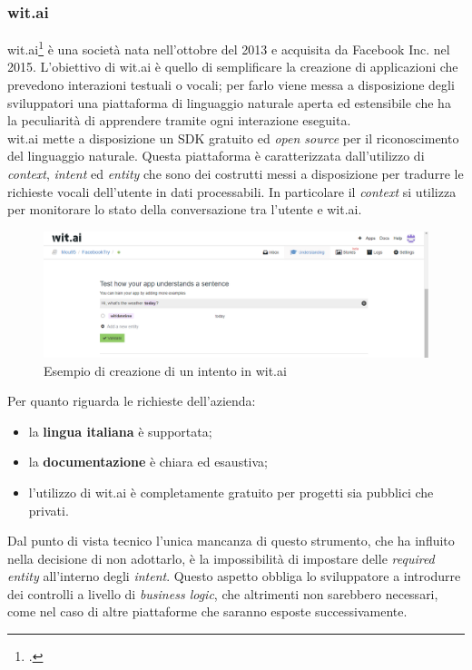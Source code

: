 \subsubsection{wit.ai}
wit.ai\footcite{witai} è una società nata nell'ottobre del 2013 e acquisita da Facebook Inc. nel 2015.
L'obiettivo di wit.ai è quello di semplificare la creazione di applicazioni che prevedono interazioni testuali o vocali; per farlo viene messa a disposizione degli sviluppatori una piattaforma di linguaggio naturale aperta ed estensibile che ha la peculiarità di apprendere tramite ogni interazione eseguita.\\
wit.ai mette a disposizione un SDK gratuito ed \emph{open source} per il riconoscimento del linguaggio
naturale. Questa piattaforma è caratterizzata dall'utilizzo di \emph{context}, \emph{intent} ed \emph{entity} che sono
dei costrutti messi a disposizione per tradurre le richieste vocali dell'utente in dati processabili. In particolare il \emph{context} si utilizza per monitorare lo stato della conversazione tra l'utente e wit.ai.

\begin{figure}[h]
	\centering
	\includegraphics[scale=0.4]{../Immagini/witai_example.png}
	\caption{Esempio di creazione di un intento in wit.ai}
\end{figure}

Per quanto riguarda le richieste dell'azienda:
\begin{itemize}
	\item la \textbf{lingua italiana} è supportata;
	\item la \textbf{documentazione} è chiara ed esaustiva;
	\item l'utilizzo di wit.ai è completamente gratuito per progetti sia pubblici che privati.
\end{itemize}

Dal punto di vista tecnico l'unica mancanza di questo strumento, che ha influito nella decisione di non adottarlo, è la impossibilità di impostare delle \emph{required entity} all'interno degli \emph{intent}. Questo aspetto obbliga lo sviluppatore a introdurre dei controlli a livello di \emph{business logic}, che altrimenti non sarebbero necessari, come nel caso di altre piattaforme che saranno esposte successivamente.

